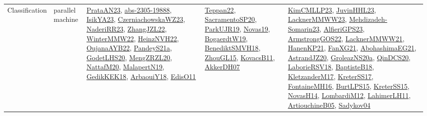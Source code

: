 {\begin{longtable}{lp{3cm}>{\raggedright}p{6cm}>{\raggedright}p{6cm}p{8cm}}
Classification & parallel machine & \href{articles/PrataAN23.pdf}{PrataAN23}\cite{PrataAN23}, \href{articles/abs-2305-19888.pdf}{abs-2305-19888}\cite{abs-2305-19888}, \href{articles/IsikYA23.pdf}{IsikYA23}\cite{IsikYA23}, \href{articles/CzerniachowskaWZ23.pdf}{CzerniachowskaWZ23}\cite{CzerniachowskaWZ23}, \href{articles/NaderiRR23.pdf}{NaderiRR23}\cite{NaderiRR23}, \href{papers/ZhangJZL22.pdf}{ZhangJZL22}\cite{ZhangJZL22}, \href{papers/WinterMMW22.pdf}{WinterMMW22}\cite{WinterMMW22}, \href{articles/HeinzNVH22.pdf}{HeinzNVH22}\cite{HeinzNVH22}, \href{papers/OujanaAYB22.pdf}{OujanaAYB22}\cite{OujanaAYB22}, \href{articles/PandeyS21a.pdf}{PandeyS21a}\cite{PandeyS21a}, \href{papers/GodetLHS20.pdf}{GodetLHS20}\cite{GodetLHS20}, \href{articles/MengZRZL20.pdf}{MengZRZL20}\cite{MengZRZL20}, \href{papers/NattafM20.pdf}{NattafM20}\cite{NattafM20}, \href{papers/MalapertN19.pdf}{MalapertN19}\cite{MalapertN19}, \href{articles/GedikKEK18.pdf}{GedikKEK18}\cite{GedikKEK18}, \href{papers/ArbaouiY18.pdf}{ArbaouiY18}\cite{ArbaouiY18}, \href{papers/EdisO11.pdf}{EdisO11}\cite{EdisO11} & \href{papers/Teppan22.pdf}{Teppan22}\cite{Teppan22}, \href{articles/SacramentoSP20.pdf}{SacramentoSP20}\cite{SacramentoSP20}, \href{papers/ParkUJR19.pdf}{ParkUJR19}\cite{ParkUJR19}, \href{articles/Novas19.pdf}{Novas19}\cite{Novas19}, \href{papers/BogaerdtW19.pdf}{BogaerdtW19}\cite{BogaerdtW19}, \href{papers/BenediktSMVH18.pdf}{BenediktSMVH18}\cite{BenediktSMVH18}, \href{papers/ZhouGL15.pdf}{ZhouGL15}\cite{ZhouGL15}, \href{articles/KovacsB11.pdf}{KovacsB11}\cite{KovacsB11}, \href{papers/AkkerDH07.pdf}{AkkerDH07}\cite{AkkerDH07} & \href{papers/KimCMLLP23.pdf}{KimCMLLP23}\cite{KimCMLLP23}, \href{papers/JuvinHHL23.pdf}{JuvinHHL23}\cite{JuvinHHL23}, \href{articles/LacknerMMWW23.pdf}{LacknerMMWW23}\cite{LacknerMMWW23}, \href{papers/Mehdizadeh-Somarin23.pdf}{Mehdizadeh-Somarin23}\cite{Mehdizadeh-Somarin23}, \href{articles/AlfieriGPS23.pdf}{AlfieriGPS23}\cite{AlfieriGPS23}, \href{papers/ArmstrongGOS22.pdf}{ArmstrongGOS22}\cite{ArmstrongGOS22}, \href{papers/LacknerMMWW21.pdf}{LacknerMMWW21}\cite{LacknerMMWW21}, \href{papers/HanenKP21.pdf}{HanenKP21}\cite{HanenKP21}, \href{articles/FanXG21.pdf}{FanXG21}\cite{FanXG21}, \href{articles/AbohashimaEG21.pdf}{AbohashimaEG21}\cite{AbohashimaEG21}, \href{articles/AstrandJZ20.pdf}{AstrandJZ20}\cite{AstrandJZ20}, \href{papers/GroleazNS20a.pdf}{GroleazNS20a}\cite{GroleazNS20a}, \href{articles/QinDCS20.pdf}{QinDCS20}\cite{QinDCS20}, \href{articles/LaborieRSV18.pdf}{LaborieRSV18}\cite{LaborieRSV18}, \href{articles/BaptisteB18.pdf}{BaptisteB18}\cite{BaptisteB18}, \href{papers/KletzanderM17.pdf}{KletzanderM17}\cite{KletzanderM17}, \href{articles/KreterSS17.pdf}{KreterSS17}\cite{KreterSS17}, \href{papers/FontaineMH16.pdf}{FontaineMH16}\cite{FontaineMH16}, \href{papers/BurtLPS15.pdf}{BurtLPS15}\cite{BurtLPS15}, \href{papers/KreterSS15.pdf}{KreterSS15}\cite{KreterSS15}, \href{articles/NovasH14.pdf}{NovasH14}\cite{NovasH14}, \href{articles/LombardiM12.pdf}{LombardiM12}\cite{LombardiM12}, \href{papers/LahimerLH11.pdf}{LahimerLH11}\cite{LahimerLH11}, \href{papers/ArtiouchineB05.pdf}{ArtiouchineB05}\cite{ArtiouchineB05}, \href{papers/Sadykov04.pdf}{Sadykov04}\cite{Sadykov04}\\

\end{longtable}}

